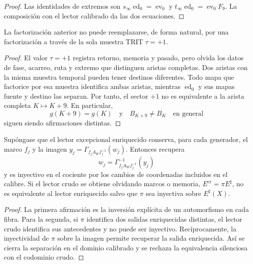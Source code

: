 \begin{proof}
Las identidades de extremos son
\(s_\infty\operatorname{ed}_0=\operatorname{ev}_0\) y
\(t_\infty\operatorname{ed}_0=\operatorname{ev}_0F_9\). La composición con
el lector calibrado da las dos ecuaciones.
\end{proof}

\begin{corollary}
\label{cor:hmt-final-no-equivalencia-retorno-gamma}
La factorización anterior no puede reemplazarse, de forma natural, por una
factorización a través de la sola muestra TRIT \(\tau=+1\).
\end{corollary}

\begin{proof}
El valor \(\tau=+1\) registra retorno, memoria y pasado, pero olvida los datos
de fase, acarreo, ruta y extremo que distinguen aristas completas. Dos aristas
con la misma muestra temporal pueden tener destinos diferentes. Todo mapa que
factorice por esa muestra identifica ambas aristas, mientras
\(\operatorname{ed}_0\) y sus mapas fuente y destino las separan. Por tanto,
el sector \(+1\) no es equivalente a la arista completa \(K\mapsto K+9\).
En particular,
\[
 g(K+9)=g(K)
 \quad\text{y}\quad
 B_{K+9}\ne B_K\quad\text{en general}
\]
siguen siendo afirmaciones distintas.
\end{proof}

\begin{proposition}
\label{prop:hmt-final-separacion-enriquecida-no-cruda}
Supóngase que el lector excepcional enriquecido conserva, para cada
generador, el marco \(f_j\) y la imagen
\(y_j=\Gamma_{f_jA_Wf_j^{-1}}(w_j)\). Entonces recupera
\[
 w_j=\Gamma_{f_jA_Wf_j^{-1}}^{-1}(y_j)
\]
y es inyectivo en el cociente por los cambios de coordenadas incluidos en el
calibre. Si el lector crudo se obtiene olvidando marcos o memoria,
\(E^{\mathrm{cr}}=\pi E^{\sharp}\), no es equivalente al lector enriquecido
salvo que \(\pi\) sea inyectiva sobre \(E^{\sharp}(X)\).
\end{proposition}

\begin{proof}
La primera afirmación es la inversión explícita de un automorfismo en cada
fibra. Para la segunda, si \(\pi\) identifica dos salidas enriquecidas
distintas, el lector crudo identifica sus antecedentes y no puede ser
inyectivo. Recíprocamente, la inyectividad de \(\pi\) sobre la imagen permite
recuperar la salida enriquecida. Así se cierra la separación en el dominio
calibrado y se rechaza la equivalencia silenciosa con el codominio crudo.
\end{proof}

